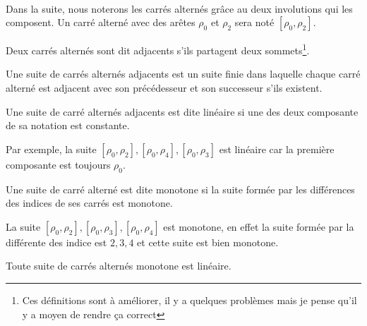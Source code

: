 \paragraph{}
Dans la suite, nous noterons les carrés alternés grâce au deux involutions qui les composent. Un carré alterné avec des arêtes $\rho_0$ et $\rho_2$ sera noté $[\rho_0, \rho_2]$.

\begin{definition}
  Deux carrés alternés sont dit adjacents s'ils partagent deux sommets\footnote{Ces définitions sont à améliorer, il y a quelques problèmes mais je pense qu'il y a moyen de rendre ça correct}.
\end{definition}

\begin{definition}
  Une suite de carrés alternés adjacents est un suite finie dans laquelle chaque carré alterné est adjacent avec son précédesseur et son successeur s'ils existent.
\end{definition}

\begin{definition}
  Une suite de carré alternés adjacents est dite linéaire si une des deux composante de sa notation est constante.
\end{definition}

Par exemple, la suite $[\rho_0, \rho_2], [\rho_0, \rho_4], [\rho_0, \rho_3]$ est linéaire car la première composante est toujours $\rho_0$.

\begin{definition}
  Une suite de carré alterné est dite monotone si la suite formée par les différences des indices de ses carrés est monotone.
\end{definition}

La suite $[\rho_0, \rho_2], [\rho_0, \rho_3], [\rho_0, \rho_4]$ est monotone, en effet la suite formée par la différente des indice est $2, 3, 4$ et cette suite est bien monotone.

\begin{proposition}
  Toute suite de carrés alternés monotone est linéaire.
\end{proposition}

